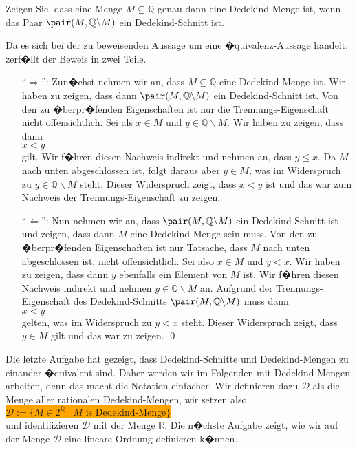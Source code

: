 \exercise
Zeigen Sie, dass eine Menge $M \subseteq \mathbb{Q}$ genau dann eine Dedekind-Menge ist, wenn das Paar $\pair(M,\mathbb{Q} \backslash M)$
ein Dedekind-Schnitt ist. \eox

\solution
Da es sich bei der zu beweisenden Aussage um eine �quivalenz-Aussage handelt,  zerf�llt der Beweis
in zwei Teile.
\begin{enumerate}
\item[``$\Rightarrow$'':] Zun�chst nehmen wir an, dass $M \subseteq \mathbb{Q}$ eine Dedekind-Menge ist.  Wir haben zu
      zeigen, dass dann $\pair(M,\mathbb{Q} \backslash M)$ ein Dedekind-Schnitt ist.  Von den zu
      �berpr�fenden Eigenschaften ist nur die Trennungs-Eigenschaft nicht offensichtlich.
      Sei als $x \in M$ und $y \in \mathbb{Q} \backslash M$.  Wir haben zu zeigen, dass dann
      \\[0.2cm]
      \hspace*{1.3cm}
      $x < y$
      \\[0.2cm]
      gilt.  Wir f�hren diesen Nachweis indirekt und nehmen an, dass $y \leq x$.  Da $M$ nach unten
      abgeschlossen ist, folgt daraus aber $y \in M$, was im Widerspruch zu $y \in \mathbb{Q} \backslash M$ steht.
      Dieser Widerspruch zeigt, dass $x < y$ ist und das war zum Nachweis der Trennungs-Eigenschaft
      zu zeigen.
\item[``$\Leftarrow$'':] Nun nehmen wir an, dass $\pair(M, \mathbb{Q} \backslash M)$ ein Dedekind-Schnitt ist und
     zeigen, dass dann $M$ eine Dedekind-Menge sein muss.  Von den zu �berpr�fenden Eigenschaften
     ist nur Tatsache, dass $M$ nach unten abgeschlossen ist, nicht offensichtlich.  Sei also $x \in M$
     und $y < x$.  Wir haben zu zeigen, dass dann $y$ ebenfalls ein Element von $M$ ist.  Wir f�hren
     diesen Nachweis indirekt und nehmen $y \in \mathbb{Q} \backslash M$ an.  Aufgrund der
     Trennungs-Eigenschaft des Dedekind-Schnitts $\pair(M, \mathbb{Q} \backslash M)$ muss dann
     \\[0.2cm]
     \hspace*{1.3cm}
     $x < y$
     \\[0.2cm]
     gelten, was im Widerspruch zu $y < x$ steht.  Dieser Widerspruch zeigt, dass $y \in M$ gilt
     und das war zu zeigen.  \qed
\end{enumerate}

Die letzte Aufgabe hat gezeigt, dass Dedekind-Schnitte und Dedekind-Mengen zu einander �quivalent
sind.  Daher werden wir im Folgenden mit Dedekind-Mengen
arbeiten,  denn das macht die Notation einfacher.  Wir definieren dazu
$\mathcal{D}$ als die Menge aller rationalen Dedekind-Mengen, wir setzen also
\\[0.2cm]
\hspace*{1.3cm}
\colorbox{orange}{
$\mathcal{D} := \bigl\{ M \in 2^{\mathbb{Q}} \mid \mbox{$M$ is Dedekind-Menge} \bigr\}$}
\\[0.2cm]
und identifizieren $\mathcal{D}$ mit der Menge $\mathbb{R}$.  Die n�chste Aufgabe zeigt, wie wir auf
der Menge $\mathcal{D}$ eine lineare Ordnung definieren k�nnen. 

